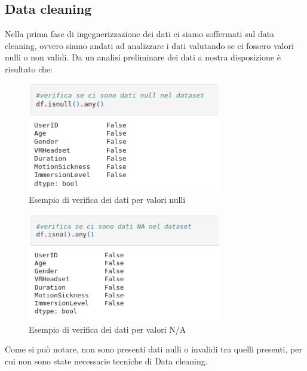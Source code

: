 \subsection{Data cleaning}
\fancyhead{}    %
\label{paragrafo 3.1}
Nella prima fase di ingegnerizzazione dei dati ci siamo soffermati sul data cleaning, ovvero siamo andati ad analizzare i dati valutando se ci fossero valori nulli o non validi.
Da un analisi preliminare dei dati a nostra disposizione è risultato che:

\begin{figure}[h]
    \centering
    \includegraphics[width=0.75\textwidth]{MetaClassAI_Documentazione/3/img/ValoriNULLDataset.png}
    \caption{Esempio di verifica dei dati per valori nulli}
    \label{fig:verifica-null-dataset}
\end{figure}

\begin{figure}[h]
    \centering
    \includegraphics[width=0.75\textwidth]{MetaClassAI_Documentazione/3/img/ValoriNADataset.png}
    \caption{Esempio di verifica dei dati per valori N/A}
    \label{fig:verifica-NA-dataset}
\end{figure}
Come si può notare, non sono presenti dati nulli o invalidi tra quelli presenti, per cui non sono state necessarie tecniche di Data cleaning.
